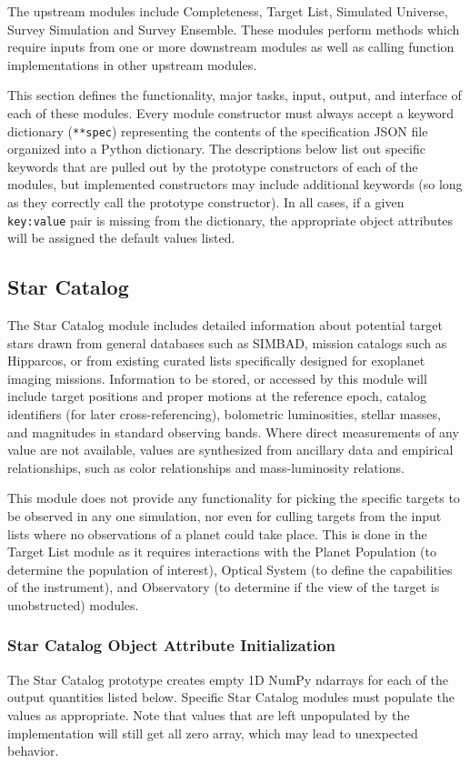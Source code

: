 \documentclass[cleanfoot]{asme2ej}
\begin{document}
The upstream modules include Completeness, Target List, Simulated Universe, Survey Simulation and Survey Ensemble. These modules perform methods which require inputs from one or more downstream modules as well as calling function implementations in other upstream modules. 

This section defines the functionality, major tasks, input, output, and interface of each of these modules. Every module constructor must always accept a keyword dictionary (\verb+**spec+) representing the contents of the specification JSON file organized into a Python dictionary. The descriptions below list out specific keywords that are pulled out by the prototype constructors of each of the modules, but implemented constructors may include additional keywords (so long as they correctly call the prototype constructor).  In all cases, if a given \verb+key:value+ pair is missing from the dictionary, the appropriate object attributes will be assigned the default values listed.


\subsection{Star Catalog} \label{sec:starcatalog}
The Star Catalog module includes detailed information about potential target stars drawn from general databases such as SIMBAD, mission catalogs such as Hipparcos, or from existing curated lists specifically designed for exoplanet imaging missions.  Information to be stored, or accessed by this module will include target positions and proper motions at the reference epoch, catalog identifiers (for later cross-referencing), bolometric luminosities, stellar masses, and magnitudes in standard observing bands.  Where direct measurements of any value are not available, values are synthesized from ancillary data and empirical relationships, such as color relationships and mass-luminosity relations.

This module does not provide any functionality for picking the specific targets to be observed in any one simulation, nor even for culling targets from the input lists where no observations of a planet could take place.  This is done in the Target List module as it requires interactions with the Planet Population (to determine the population of interest), Optical System (to define the capabilities of the instrument), and Observatory (to determine if the view of the target is unobstructed) modules.

\subsubsection{Star Catalog Object Attribute Initialization} 
The Star Catalog prototype creates empty 1D NumPy ndarrays for each of the output quantities listed below.  Specific Star Catalog modules must populate the values as appropriate.  Note that values that are left unpopulated by the implementation will still get all zero array, which may lead to unexpected behavior.
\end{document}
